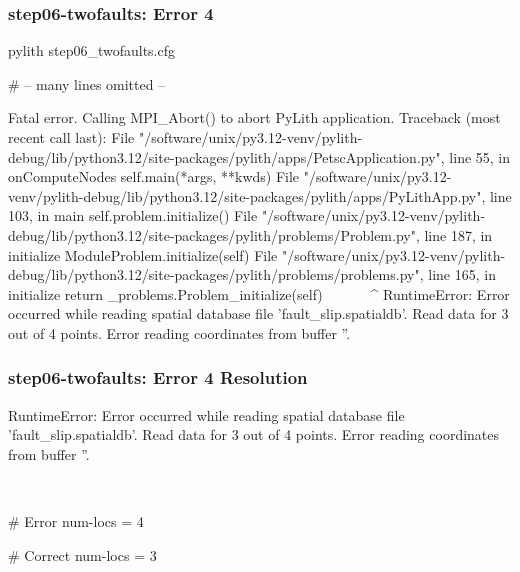 \documentclass[aspectratio=169]{beamer}
\begin{document}
\begin{frame}[fragile]
  \frametitle{{\ttfamily step06-twofaults}: Error 4}

\begin{bashcode}
pylith step06_twofaults.cfg

# -- many lines omitted --

Fatal error. Calling MPI_Abort() to abort PyLith application.
Traceback (most recent call last):
  File "/software/unix/py3.12-venv/pylith-debug/lib/python3.12/site-packages/pylith/apps/PetscApplication.py", line 55, in onComputeNodes
    self.main(*args, **kwds)
  File "/software/unix/py3.12-venv/pylith-debug/lib/python3.12/site-packages/pylith/apps/PyLithApp.py", line 103, in main
    self.problem.initialize()
  File "/software/unix/py3.12-venv/pylith-debug/lib/python3.12/site-packages/pylith/problems/Problem.py", line 187, in initialize
    ModuleProblem.initialize(self)
  File "/software/unix/py3.12-venv/pylith-debug/lib/python3.12/site-packages/pylith/problems/problems.py", line 165, in initialize
    return _problems.Problem_initialize(self)
           ^^^^^^^^^^^^^^^^^^^^^^^^^^^^^^^^^^
RuntimeError: Error occurred while reading spatial database file 'fault_slip.spatialdb'.
Read data for 3 out of 4 points.
Error reading coordinates from buffer ''.
\end{bashcode}

\end{frame}


\begin{frame}[t,fragile]
  \frametitle{{\ttfamily step06-twofaults}: Error 4 Resolution}

  \tserror
  \begin{bashcode}
RuntimeError: Error occurred while reading spatial database file 'fault_slip.spatialdb'.
Read data for 3 out of 4 points.
Error reading coordinates from buffer ''.
  \end{bashcode}

  \pause\\[1pt]

  \begin{cfgcode}
    # Error
    num-locs = 4

    # Correct
    num-locs = 3
  \end{cfgcode}

\end{frame}
\end{document}

